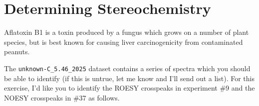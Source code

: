\documentclass[../psets.tex]{subfiles}
\begin{document}
\section{Determining Stereochemistry}
Aflatoxin B1 is a toxin produced by a fungus which grows on a number of plant species, but is best known for causing liver carcinogenicity from contaminated peanuts.
\begin{center}
    \footnotesize
\end{center}
The \verb|unknown-C_5.46_2025| dataset contains a series of spectra which you should be able to identify (if this is untrue, let me know and I'll send out a list). For this exercise, I'd like you to identify the ROESY crosspeaks in experiment \#9 and the NOESY crosspeaks in \#37 as follows.
\end{document}
